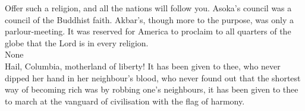 Offer such a religion, and all the nations will follow you.
Asoka's council was a
council of the Buddhist faith. Akbar's, though more to the purpose, was
only a
parlour-meeting. It was reserved for America to proclaim to all
quarters of the globe
that the Lord is in every religion.\\

None\\

Hail, Columbia, motherland of liberty! It has been given to
thee, who never dipped
her hand in her neighbour’s blood, who never found out that the
shortest way of
becoming rich was by robbing one’s neighbours, it has been given to
thee to march
at the vanguard of civilisation with the flag of harmony.\\

